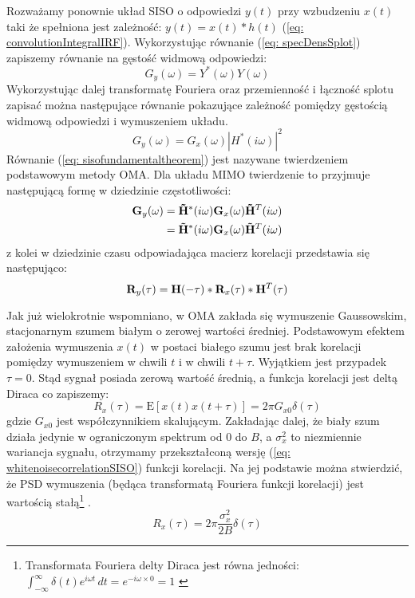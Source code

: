 Rozważamy ponownie układ SISO o odpowiedzi $y(t)$ przy wzbudzeniu $x(t)$ taki że spełniona jest zależność: $y(t)=x(t)*h(t)$ (\ref{eq: convolutionIntegralIRF}). Wykorzystując równanie (\ref{eq: specDensSplot}) zapiszemy równanie na gęstość widmową odpowiedzi:
\begin{equation} \label{g}
	G_{y}(\omega) = Y^*(\omega)Y(\omega)
\end{equation}
Wykorzystując dalej transformatę Fouriera oraz przemienność i łączność splotu zapisać można następujące równanie pokazujące zależność pomiędzy gęstością widmową odpowiedzi i wymuszeniem układu.
\begin{equation} \label{eq: sisofundamentaltheorem}
	G_{y}(\omega) = G_x(\omega)|H^*(i\omega)|^2
\end{equation}
Równanie (\ref{eq: sisofundamentaltheorem}) jest nazywane twierdzeniem podstawowym  metody OMA. Dla układu MIMO twierdzenie to przyjmuje następującą formę w dziedzinie częstotliwości:
\begin{equation} \label{eq: matrixoutputspectraldensity}
	\begin{split}
		\mathbf{G}_{y}(\omega) &=\mathbf{\tilde{H}}^*(i\omega)\mathbf{G}_x(\omega)\mathbf{\tilde{H}}^T(i\omega)\\
		&=\mathbf{\tilde{H}}^*(i\omega)\mathbf{G}_x(\omega)\mathbf{\tilde{H}}^T(i\omega)
	\end{split}
\end{equation}
z kolei w dziedzinie czasu odpowiadająca macierz korelacji przedstawia się następująco:
\begin{equation} \label{eq: matrixoutputcorrelation}
	\mathbf{R}_y(\tau)=\mathbf{H}(-\tau)*\mathbf{R}_x(\tau)*\mathbf{H}^T(\tau)
\end{equation}

Jak już wielokrotnie wspomniano, w OMA zakłada się wymuszenie Gaussowskim, stacjonarnym szumem białym o zerowej wartości średniej. Podstawowym efektem założenia wymuszenia $x(t)$ w postaci białego szumu jest brak korelacji pomiędzy wymuszeniem w chwili $t$ i w chwili $t+\tau$. Wyjątkiem jest przypadek $\tau=0$. Stąd sygnał posiada zerową wartość średnią, a funkcja korelacji jest deltą Diraca co zapiszemy:
\begin{equation}
	R_x(\tau)=\mathrm{E}[x(t)x(t+\tau)] = 2\pi G_{x0} \delta(\tau)
\end{equation} 
gdzie $G_{x0}$ jest współczynnikiem skalującym. Zakładając dalej, że biały szum działa jedynie w ograniczonym spektrum od $0$ do $B$, a $\sigma_x^2$ to niezmiennie wariancja sygnału, otrzymamy przekształconą wersję (\ref{eq: whitenoisecorrelationSISO}) funkcji korelacji. Na jej podstawie można stwierdzić, że PSD wymuszenia (będąca transformatą Fouriera funkcji korelacji) jest wartością stałą\footnote{
	Transformata Fouriera delty Diraca jest równa jedności: $\int_{-\infty}^{\infty} \delta(t) e^{i\omega t}\,dt = e^{-i\omega\times 0}=1$ \parencite{Zielinski2002}} .
\begin{equation} \label{eq: whitenoisecorrelationSISO}
	R_x(\tau)=2\pi \frac{\sigma_x^2}{2B} \delta(\tau)
\end{equation} 

